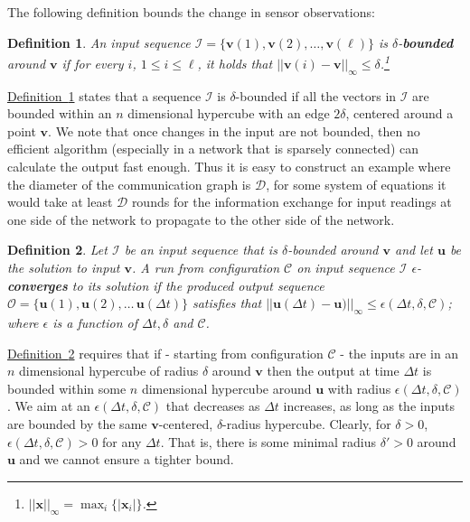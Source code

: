 \documentclass[preprint,12pt]{elsarticle}
\newtheorem{definition}{Definition}
\newcommand{\namedref}[2]{\hyperref[#2]{#1~\ref*{#2}}}
\newcommand{\definitionref}[1]{\namedref{Definition}{#1}}
\newcommand\C{\mathcal{C}}
\newcommand\norm[1]{\left|\left|#1\right|\right|}
\newcommand\normi[1]{\left|\left|#1\right|\right|_\infty}
\newcommand{\uu}{\mathbf{u}}
\newcommand{\vv}{\mathbf{v}}
\newcommand{\xx}{\mathbf{x}}
\newcommand{\D}{\mathcal{D}}
\begin{document}
The following definition bounds the change in sensor observations:
\begin{definition}\label{def:concentrated}
  An input sequence $\mathcal{I} = \{\vv(1), \vv(2), \dots, \vv(\ell)\}$ is $\delta$-{\bf bounded} around
  $\vv$ if for every $i$, $1 \leq i \leq \ell$, it holds that $\norm{\vv(i)-\vv}_\infty \leq
  \delta$.\footnote{$\norm{\xx}_\infty = \max_i \{ |\xx_i| \}$.}
\end{definition}

\definitionref{def:concentrated} states that a sequence $\mathcal{I}$ is $\delta$-bounded if all
the vectors in $\mathcal{I}$
are bounded within an $n$ dimensional hypercube with an edge $2
\delta$, centered around a point $\vv$. We note that once changes
in the input are not bounded, then no efficient algorithm
(especially in a network that is sparsely connected) can calculate
the output fast enough. Thus it is easy to construct an example where the diameter of the
communication graph is $\D$, for some system of equations it would
take at least $\D$ rounds for the information exchange for input readings at
one side of the network to propagate to the other side of the
network.

\begin{definition}\label{def:runconverges}
  Let $\mathcal{I}$ be an input sequence that is $\delta$-bounded
  around $\vv$ and let $\uu$ be the solution to input $\vv$.
  A run from configuration $\C$ on input sequence $\mathcal{I}$ $\epsilon$-{\bf converges} to its solution if
  the produced output sequence $\mathcal{O} = \{\uu(1), \uu(2), \dots\, \uu(\Delta t)\}$ satisfies that
  $\normi{\uu(\Delta t)-\uu)}\leq \epsilon(\Delta t, \delta, \C)$; where $\epsilon$
  is a function of $\Delta t, \delta$ and $\C$.
\end{definition}

\definitionref{def:runconverges} requires that if - starting from
configuration $\C$ - the inputs are in an $n$ dimensional hypercube of
radius $\delta$ around $\vv$ then the output at time $\Delta t$ is
bounded within some $n$ dimensional hypercube around $\uu$ with
radius $\epsilon(\Delta t, \delta, \C)$. We aim at an
$\epsilon(\Delta t, \delta, \C)$ that decreases as $\Delta t$
increases, as long as the inputs are bounded by the same
$\vv$-centered, $\delta$-radius hypercube. Clearly, for $\delta
>0$, $\epsilon(\Delta t, \delta, \C) > 0$ for any $\Delta t$. That is, there
is some minimal radius $\delta' >0$ around $\uu$ and we cannot
ensure a tighter bound.
\end{document}
